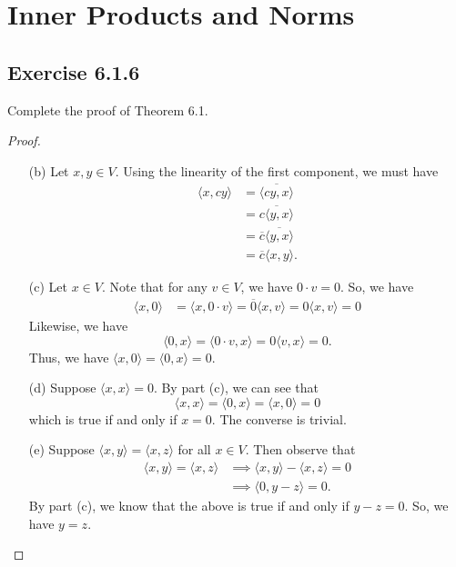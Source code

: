 \section{Inner Products and Norms}

\subsection*{Exercise 6.1.6} Complete the proof of Theorem 6.1.
\begin{proof}
\begin{enumerate}
    \item[(b)] Let \( x,y \in V  \). Using the linearity of the first component, we must have 
        \begin{align*}
            \langle x, cy \rangle &= \overline{\langle cy, x  \rangle} \\
                                  &= \overline{c \langle y,x \rangle} \\ 
                                  &= \overline{c} \overline{\langle y,x \rangle} \\
                                  &= \overline{c} \langle  x,y  \rangle.
        \end{align*}
    \item[(c)] Let \( x \in V  \). Note that for any \( v \in V   \), we have \( 0 \cdot v = 0  \). So, we have
        \begin{align*}
            \langle x,0 \rangle &= \langle x, 0 \cdot v  \rangle = \overline{0} \langle x , v  \rangle  = 0 \langle x, v  \rangle = 0  
        \end{align*}
        Likewise, we have
        \[  \langle 0,x  \rangle = \langle  0 \cdot v , x  \rangle =  0 \langle v , x  \rangle = 0. \]
        Thus, we have \( \langle x,0  \rangle = \langle 0, x  \rangle = 0  \).
    \item[(d)] Suppose \( \langle x,x \rangle = 0  \). By part (c), we can see that 
        \[  \langle x , x \rangle = \langle 0  , x  \rangle = \langle x , 0  \rangle = 0    \]
        which is true if and only if \( x = 0  \). The converse is trivial.
    \item[(e)] Suppose \( \langle x , y \rangle = \langle x , z \rangle  \) for all \( x \in V  \). Then observe that 
        \begin{align*}
            \langle x , y \rangle  = \langle x , z \rangle &\implies \langle x , y \rangle - \langle x , z \rangle = 0   \\
                                                           &\implies \langle 0  ,  y -z  \rangle = 0.
        \end{align*}
        By part (c), we know that the above is true if and only if \( y - z = 0  \). So, we have \( y = z  \).
\end{enumerate}
\end{proof}


